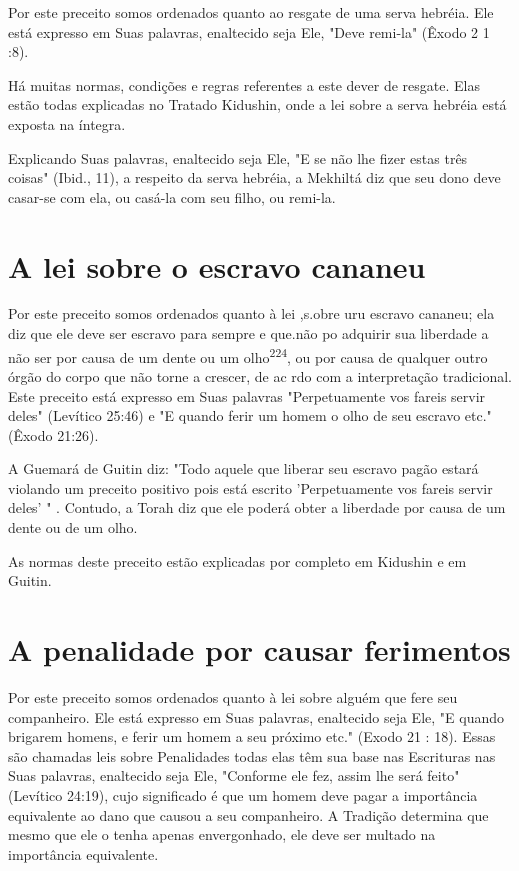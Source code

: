 Por este preceito somos ordenados quanto ao resgate de uma serva
hebréia. Ele está expresso em Suas palavras, enaltecido seja Ele, "Deve
remi-la" (Êxodo 2 1 :8).

Há muitas normas, condições e regras referentes a este dever de
res­gate. Elas estão todas explicadas no Tratado Kidushin, onde a lei
sobre a serva hebréia está exposta na íntegra.

Explicando Suas palavras, enaltecido seja Ele, "E se não lhe fizer
es­tas três coisas" (Ibid., 11), a respeito da serva hebréia, a Mekhiltá
diz que seu dono deve casar-se com ela, ou casá-la com seu filho, ou
remi-la.

\section{A lei sobre o escravo cananeu}

Por este preceito somos ordenados quanto à lei ,s.obre
uru escravo cananeu; ela diz que ele deve ser escravo para sempre e
que.não po adquirir sua liberdade a não ser por causa
de um dente ou um olho\textsuperscript{224}, ou por causa de qualquer
outro órgão do corpo que não torne a crescer, de ac rdo com a
interpretação tradicional. Este preceito está expresso em Suas palavras
"Perpe­tuamente vos fareis servir deles" (Levítico 25:46) e "E quando
ferir um homem o olho de seu escravo etc." (Êxodo 21:26).

A Guemará de Guitin diz: "Todo aquele que liberar seu escravo pa­gão
estará violando um preceito positivo pois está escrito 'Perpetuamente
vos fareis servir deles' " . Contudo, a Torah diz que ele poderá obter a
liberdade por causa de um dente ou de um olho.

As normas deste preceito estão explicadas por completo em Kidus­hin e em
Guitin.

\section{A penalidade por causar ferimentos}

Por este preceito somos ordenados quanto à lei sobre alguém que fere seu
companheiro. Ele está expresso em Suas palavras, enaltecido seja Ele, "E
quando brigarem homens, e ferir um homem a seu próximo etc." (Exodo 21 :
18). Essas são chamadas leis sobre Penalidades todas elas têm sua base
nas Escrituras nas Suas palavras, enaltecido seja Ele, "Conforme ele
fez, assim lhe será feito" (Levítico 24:19), cujo significado é que um
homem deve pagar a im­portância equivalente ao dano que causou a seu
companheiro. A Tradição de­termina que mesmo que ele o tenha apenas
envergonhado, ele deve ser multa­do na importância equivalente.

